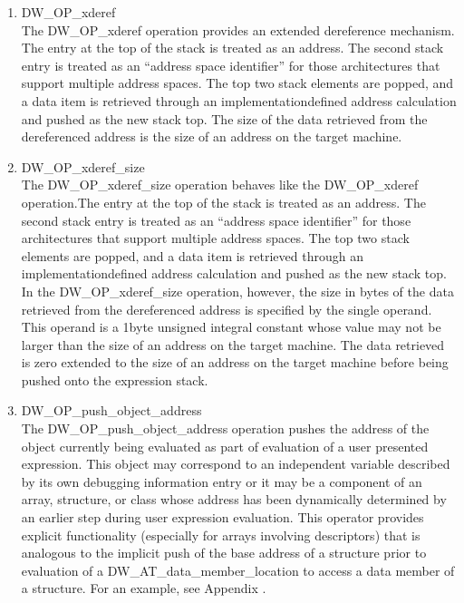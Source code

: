 \begin{enumerate}[1]
\label{chap:DWOPxderef}
\item DW\_OP\_xderef \\
The DW\_OP\_xderef operation provides an extended dereference
mechanism. The entry at the top of the stack is treated as an
address. The second stack entry is treated as an “address
space identifier” for those architectures that support
multiple address spaces. The top two stack elements are popped,
and a data item is retrieved through an implementation\dash defined
address calculation and pushed as the new stack top. The size
of the data retrieved from the dereferenced address is the
size of an address on the target machine.

\label{chap:DWOPxderefsize}
\item  DW\_OP\_xderef\_size \\
The DW\_OP\_xderef\_size operation behaves like the
DW\_OP\_xderef operation.The entry at the top of the stack is
treated as an address. The second stack entry is treated as
an “address space identifier” for those architectures
that support multiple address spaces. The top two stack
elements are popped, and a data item is retrieved through an
implementation\dash defined address calculation and pushed as the
new stack top. In the DW\_OP\_xderef\_size operation, however,
the size in bytes of the data retrieved from the dereferenced
address is specified by the single operand. This operand is a
1\dash byte unsigned integral constant whose value may not be larger
than the size of an address on the target machine. The data
retrieved is zero extended to the size of an address on the
target machine before being pushed onto the expression stack.

\label{chap:DWOPpushobjectaddress}
\item DW\_OP\_push\_object\_address \\
The DW\_OP\_push\_object\_address operation pushes the address
of the object currently being evaluated as part of evaluation
of a user presented expression. This object may correspond
to an independent variable described by its own debugging
information entry or it may be a component of an array,
structure, or class whose address has been dynamically
determined by an earlier step during user expression
evaluation.  This operator provides explicit functionality
(especially for arrays involving descriptors) that is analogous
to the implicit push of the base address of a structure prior
to evaluation of a DW\_AT\_data\_member\_location to access a
data member of a structure. For an example, see 
Appendix .


\end{enumerate}
